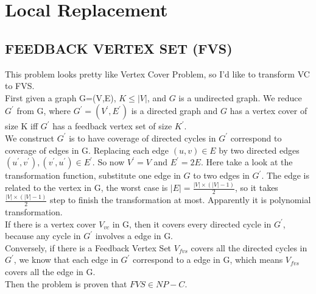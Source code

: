 \documentclass[12pt]{report}
\begin{document}
\section{Local Replacement}

\subsection{FEEDBACK VERTEX SET (FVS)}
This problem looks pretty like Vertex Cover Problem, so I'd like to transform VC to FVS. \\
First given a graph G=(V,E), $K \le |V|$, and $G$ is a undirected graph. We reduce $G^{'}$ from G, where $G^{'} = (V^{'}, E^{'})$ is a directed graph and $G$ has a vertex cover of size K iff $G^{'}$ has a feedback vertex set of size $K^{'}$. \\
We construct $G^{'}$ is to have coverage of directed cycles in $G^{'}$ correspond to coverage of edges in G. Replacing each edge $(u,v) \in E$ by two directed edges $(u^{'}, v^{'}), (v^{'}, u^{'}) \in E^{'}$. So now $V^{'} = V$ and $E^{'} = 2E$. Here take a look at the transformation function, substitute one edge in $G$ to two edges in $G^{'}$. The edge is related to the vertex in G, the worst case is $|E| = \frac {|V| \times (|V|-1)}{2}$, so it takes $\frac {|V| \times (|V|-1)}{2}$ step to finish the transformation at most. Apparently it is polynomial transformation. \\
If there is a vertex cover $V_{vc}$ in G, then it covers every directed cycle in $G^{'}$, because any cycle in $G^{'}$ involves a edge in G. \\
Conversely, if there is a Feedback Vertex Set $V_{fvs}$ covers all the directed cycles in $G^{'}$, we know that each edge in $G^{'}$ correspond to a edge in G, which means $V_{fvs}$ covers all the edge in G. \\
Then the problem is proven that $FVS \in NP-C$.
\end{document}
